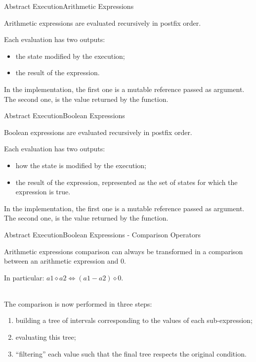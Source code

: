 \documentclass{beamer}
\begin{document}
\begin{frame}{Abstract Execution}{Arithmetic Expressions}

    Arithmetic expressions are evaluated recursively in postfix order.

    Each evaluation has two outputs:
    \begin{itemize}
        \item the state modified by the execution;
        \item the result of the expression.
    \end{itemize}

    In the implementation, the first one is a mutable reference passed as argument.
    The second one, is the value returned by the function.

\end{frame}

\begin{frame}{Abstract Execution}{Boolean Expressions}

    Boolean expressions are evaluated recursively in postfix order.

    Each evaluation has two outputs:
    \begin{itemize}
        \item how the state is modified by the execution;
        \item the result of the expression, represented as the set of states for which the expression is true.
    \end{itemize}

    In the implementation, the first one is a mutable reference passed as argument.
    The second one, is the value returned by the function.

\end{frame}

\begin{frame}{Abstract Execution}{Boolean Expressions - Comparison Operators}

    Arithmetic expressions comparison can always be transformed in a comparison between an arithmetic expression and $0$.

    In particular: $\textit{a1} \diamond \textit{a2} \iff (\textit{a1} - \textit{a2}) \diamond 0$.

    ~\\
    The comparison is now performed in three steps:
    \begin{enumerate}
        \item building a tree of intervals corresponding to the values of each sub-expression;
        \item evaluating this tree;
        \item ``filtering'' each value such that the final tree respects the original condition.
    \end{enumerate}

\end{frame}
\end{document}
